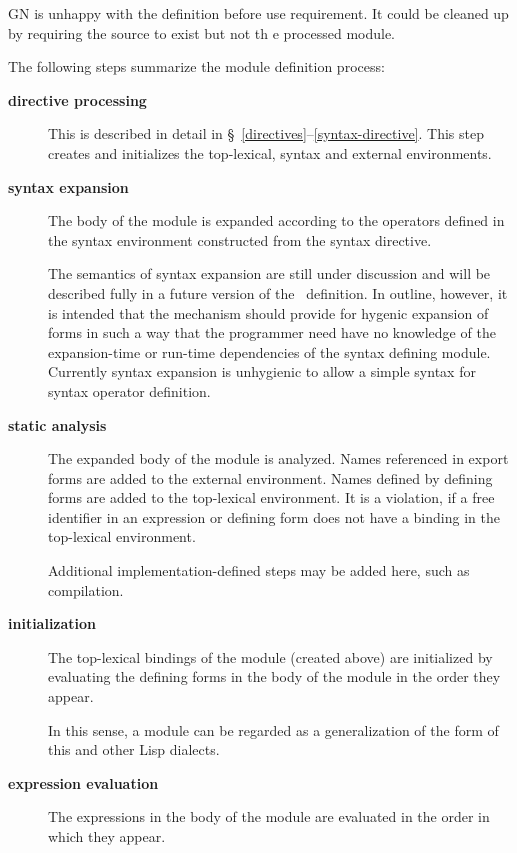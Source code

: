 %
\begin{optPrivate}
    GN is unhappy with the definition before use requirement.  It could be
    cleaned up by requiring the source to exist but not th e processed module.
\end{optPrivate}
%
\begin{optDefinition}
The following steps summarize the module definition process:
%
\begin{description}
    \item[{\bf directive processing}] This is described in detail in
    \S~\ref{directives}--\ref{syntax-directive}.  This step creates and
    initializes the top-lexical, syntax and external environments.

    \item[{\bf syntax expansion}] 
     
     The body of the module is expanded
    according to the operators defined in the syntax environment constructed
    from the syntax directive.
    \begin{note}
        The semantics of syntax expansion are still under discussion and will be
        described fully in a future version of the \eulisp\ definition.  In
        outline, however, it is intended that the mechanism should provide for
        hygenic expansion of forms in such a way that the programmer need have
        no knowledge of the expansion-time or run-time dependencies of the
        syntax defining module.  Currently syntax expansion is unhygienic to
        allow a simple syntax for syntax operator definition.
    \end{note}

    \item[{\bf static analysis}] The expanded body of the module is analyzed.
    Names referenced in export forms are added to the external environment.
    Names defined by defining forms are added to the top-lexical environment. It
    is a violation, if a free identifier in an expression or defining form
    does not have a binding in the top-lexical environment.
    \begin{note}
        Additional implementation-defined steps may be added here, such as
        compilation.
    \end{note}

    \item[{\bf initialization}] The top-lexical bindings of the module (created
    above) are initialized by evaluating the defining forms in the body of the
    module in the order they appear.
    \begin{note}
        In this sense, a module can be regarded as a generalization of the
         form of this and other Lisp dialects.
    \end{note}

    \item[{\bf expression evaluation}] The expressions in the body of the module
    are evaluated in the order in which they appear.
\end{description}
%
\end{optDefinition}
